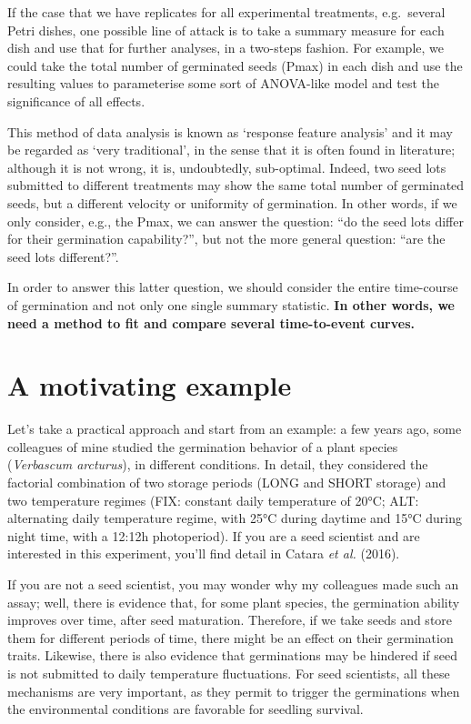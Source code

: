 \documentclass[
]{book}
\begin{document}
If the case that we have replicates for all experimental treatments, e.g.~several Petri dishes, one possible line of attack is to take a summary measure for each dish and use that for further analyses, in a two-steps fashion. For example, we could take the total number of germinated seeds (Pmax) in each dish and use the resulting values to parameterise some sort of ANOVA-like model and test the significance of all effects.

This method of data analysis is known as `response feature analysis' and it may be regarded as `very traditional', in the sense that it is often found in literature; although it is not wrong, it is, undoubtedly, sub-optimal. Indeed, two seed lots submitted to different treatments may show the same total number of germinated seeds, but a different velocity or uniformity of germination. In other words, if we only consider, e.g., the Pmax, we can answer the question: ``do the seed lots differ for their germination capability?'', but not the more general question: ``are the seed lots different?''.

In order to answer this latter question, we should consider the entire time-course of germination and not only one single summary statistic. \textbf{In other words, we need a method to fit and compare several time-to-event curves.}

\hypertarget{a-motivating-example}{%
\section{A motivating example}\label{a-motivating-example}}

Let's take a practical approach and start from an example: a few years ago, some colleagues of mine studied the germination behavior of a plant species (\emph{Verbascum arcturus}), in different conditions. In detail, they considered the factorial combination of two storage periods (LONG and SHORT storage) and two temperature regimes (FIX: constant daily temperature of 20°C; ALT: alternating daily temperature regime, with 25°C during daytime and 15°C during night time, with a 12:12h photoperiod). If you are a seed scientist and are interested in this experiment, you'll find detail in Catara \emph{et al.} (2016).

If you are not a seed scientist, you may wonder why my colleagues made such an assay; well, there is evidence that, for some plant species, the germination ability improves over time, after seed maturation. Therefore, if we take seeds and store them for different periods of time, there might be an effect on their germination traits. Likewise, there is also evidence that germinations may be hindered if seed is not submitted to daily temperature fluctuations. For seed scientists, all these mechanisms are very important, as they permit to trigger the germinations when the environmental conditions are favorable for seedling survival.
\end{document}
